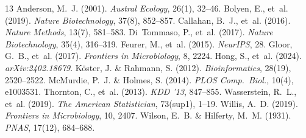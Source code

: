 \documentclass[11pt,a4paper]{article}
\begin{document}

\begin{thebibliography}{13}
 Anderson, M.~J. (2001). \textit{Austral Ecology}, 26(1), 32--46.
 Bolyen, E., et~al. (2019). \textit{Nature Biotechnology}, 37(8), 852--857.
 Callahan, B.~J., et~al. (2016). \textit{Nature Methods}, 13(7), 581--583.
 Di~Tommaso, P., et~al. (2017). \textit{Nature Biotechnology}, 35(4), 316--319.
 Feurer, M., et~al. (2015). \textit{NeurIPS}, 28.
 Gloor, G.~B., et~al. (2017). \textit{Frontiers in Microbiology}, 8, 2224.
 Hong, S., et~al. (2024). \textit{arXiv:2402.18679}.
 K{\"o}ster, J. \& Rahmann, S. (2012). \textit{Bioinformatics}, 28(19), 2520--2522.
 McMurdie, P.~J. \& Holmes, S. (2014). \textit{PLOS Comp.\ Biol.}, 10(4), e1003531.
 Thornton, C., et~al. (2013). \textit{KDD '13}, 847--855.
 Wasserstein, R.~L., et~al. (2019). \textit{The American Statistician}, 73(sup1), 1--19.
 Willis, A.~D. (2019). \textit{Frontiers in Microbiology}, 10, 2407.
 Wilson, E.~B. \& Hilferty, M.~M. (1931). \textit{PNAS}, 17(12), 684--688.
\end{thebibliography}
\end{document}
